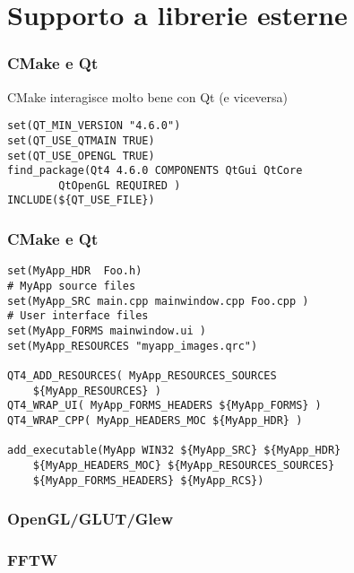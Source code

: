 \documentclass[12pt] {beamer}
\begin{document}

\section{Supporto a librerie esterne}
\begin{frame}[fragile]
\frametitle{CMake e Qt}
CMake interagisce molto bene con Qt (e viceversa)
\begin{footnotesize}
\begin{verbatim}
set(QT_MIN_VERSION "4.6.0")
set(QT_USE_QTMAIN TRUE)
set(QT_USE_OPENGL TRUE)
find_package(Qt4 4.6.0 COMPONENTS QtGui QtCore 
	    QtOpenGL REQUIRED )
INCLUDE(${QT_USE_FILE})
\end{verbatim}
\end{footnotesize}
\end{frame}


\begin{frame}[fragile]
 \frametitle{CMake e Qt}
\begin{footnotesize}
\begin{verbatim}
set(MyApp_HDR  Foo.h)
# MyApp source files
set(MyApp_SRC main.cpp mainwindow.cpp Foo.cpp )
# User interface files
set(MyApp_FORMS mainwindow.ui ) 
set(MyApp_RESOURCES "myapp_images.qrc")

QT4_ADD_RESOURCES( MyApp_RESOURCES_SOURCES 
    ${MyApp_RESOURCES} )
QT4_WRAP_UI( MyApp_FORMS_HEADERS ${MyApp_FORMS} )
QT4_WRAP_CPP( MyApp_HEADERS_MOC ${MyApp_HDR} )

add_executable(MyApp WIN32 ${MyApp_SRC} ${MyApp_HDR}
    ${MyApp_HEADERS_MOC} ${MyApp_RESOURCES_SOURCES}
    ${MyApp_FORMS_HEADERS} ${MyApp_RCS})
\end{verbatim}
\end{footnotesize}
\end{frame}



\begin{frame}
\frametitle{OpenGL/GLUT/Glew}
\end{frame}

\begin{frame}
 \frametitle{FFTW}
\end{frame}
\end{document}
